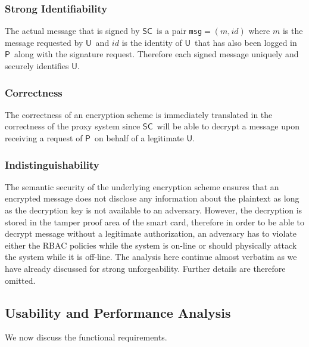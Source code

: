 \documentclass{sig-alternate}
\newcommand{\User}{\ensuremath{\mathsf{U}}}
\newcommand{\Proxy}{\ensuremath{\mathsf{P}}}
\newcommand{\SC}{\ensuremath{\mathsf{SC}}}
\begin{document}
\subsubsection{Strong Identifiability} The actual message that is signed by \SC\ is a pair {\tt msg}$=(m,id)$ where $m$ is the message requested by \User\ and $id$ is the identity of \User\ that has also been logged in \Proxy\ along with the signature request. Therefore each signed message uniquely and securely identifies \User.

\subsubsection{Correctness} The correctness of an encryption scheme is immediately translated in the correctness of the proxy system since \SC\ will be able to decrypt a message upon receiving a request of \Proxy\ on behalf of a legitimate \User.

\subsubsection{Indistinguishability} The semantic security of the underlying encryption scheme ensures that an encrypted message does not disclose any information about the plaintext as long as the decryption key is not available to an adversary. However, the decryption is stored in the tamper proof area of the smart card, therefore in order to be able to decrypt message without a legitimate authorization, an adversary has to violate either the RBAC policies while the system is on-line or should physically attack the system while it is off-line. The analysis here continue almost verbatim as we have already discussed for strong unforgeability.
Further details are therefore omitted.

\subsection{Usability and Performance Analysis}
We now discuss the functional requirements.
\end{document}
